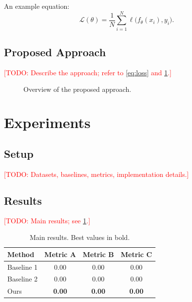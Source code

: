 \documentclass[11pt,a4paper]{article}
\theoremstyle{definition}
\newcommand{\todo}[1]{\textcolor{red}{[TODO: #1]}}
\begin{document}
An example equation:
\begin{equation}
  \mathcal{L}(\theta) = \frac{1}{N}\sum_{i=1}^{N} \ell\big(f_\theta(x_i), y_i\big).
  \label{eq:loss}
\end{equation}

\subsection{Proposed Approach}
\todo{Describe the approach; refer to \cref{eq:loss} and \cref{fig:overview}.}

\begin{figure}[t]
  \centering
  \caption{Overview of the proposed approach.}
  \label{fig:overview}
\end{figure}

\section{Experiments}
\label{sec:experiments}

\subsection{Setup}
\todo{Datasets, baselines, metrics, implementation details.}

\subsection{Results}
\todo{Main results; see \cref{tab:results}.}

\begin{table}[t]
  \centering
  \caption{Main results. Best values in bold.}
  \label{tab:results}
  \begin{tabular}{lccc}
    \toprule
    Method        & Metric A       & Metric B       & Metric C \\
    \midrule
    Baseline 1    & 0.00           & 0.00           & 0.00 \\
    Baseline 2    & 0.00           & 0.00           & 0.00 \\
    Ours          & \textbf{0.00}  & \textbf{0.00}  & \textbf{0.00} \\
    \bottomrule
  \end{tabular}
\end{table}
\end{document}
